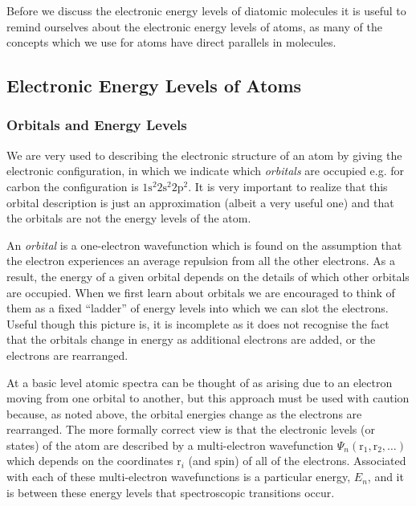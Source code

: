\documentclass{article}
\theoremstyle{plain}\theoremheaderfont{\normalfont\itshape}\theorembodyfont{\rmfamily}\theoremseparator{.}\newtheorem*{rem}{Remark}\newtheorem*{ex}{Example}\newtheorem*{proof}{Proof}\newtheorem*{altp}{Alternative proof}
\theoremstyle{plain}\theoremheaderfont{\normalfont\bfseries}\theorembodyfont{\rmfamily}\theoremseparator{.}\newtheorem{thm}{Theorem}[section]\newtheorem{lem}[thm]{Lemma}\newtheorem{prop}[thm]{Proposition}\newtheorem*{cor}{Corollary}\newtheorem{defn}[thm]{Definition}\newtheorem{clm}[thm]{Claim}\newtheorem{clminproof}{Claim}\newtheorem{pos}{Postulate}[section]
\theoremstyle{break}\theoremheaderfont{\normalfont\itshape}\theorembodyfont{\rmfamily}\theoremseparator{.\medskip}\newtheorem*{proofskip}{Proof}\newtheorem*{exs}{Examples}\newtheorem*{rems}{Remarks}
\theoremstyle{break}\theoremheaderfont{\normalfont\bfseries}\theorembodyfont{\rmfamily}\theoremseparator{.\medskip}\newtheorem{lemskip}[thm]{Lemma}\newtheorem{defnskip}[thm]{Definition}\newtheorem{propskip}[thm]{Proposition}\newtheorem{thmskip}[thm]{Theorem}
\numberwithin{equation}{section}
\newcommand{\vb}[1]{\bm{\mathrm{#1}}}
\begin{document}
    Before we discuss the electronic energy levels of diatomic molecules it is useful to remind ourselves about the electronic energy levels of atoms, as many of the concepts which we use for atoms have direct parallels in molecules.

    \subsection{Electronic Energy Levels of Atoms}
    \subsubsection{Orbitals and Energy Levels}
    We are very used to describing the electronic structure of an atom by giving the electronic configuration, in which we indicate which \textit{orbitals} are occupied e.g. for carbon the configuration is \(\mathrm{1s^2 2s^2 2p^2}\). It is very important to realize that this orbital description is just an approximation (albeit a very useful one) and that the orbitals are not the energy levels of the atom.

    An \textit{orbital} is a one-electron wavefunction which is found on the assumption that the electron experiences an average repulsion from all the other electrons. As a result, the energy of a given orbital depends on the details of which other orbitals are occupied. When we first learn about orbitals we are encouraged to think of them as a fixed “ladder” of energy levels into which we can slot the electrons. Useful though this picture is, it is incomplete as it does not recognise the fact that the orbitals change in energy as additional electrons are added, or the electrons are rearranged.

    At a basic level atomic spectra can be thought of as arising due to an electron moving from one orbital to another, but this approach must be used with caution because, as noted above, the orbital energies change as the electrons are rearranged. The more formally correct view is that the electronic levels (or states) of the atom are described by a multi-electron wavefunction \(\Psi_n(\vb{r}_1,\vb{r}_2,\dots)\) which depends on the coordinates \(\vb{r}_i\) (and spin) of all of the electrons. Associated with each of these multi-electron wavefunctions is a particular energy, \(E_n\), and it is between these energy levels that spectroscopic transitions occur.
\end{document}
